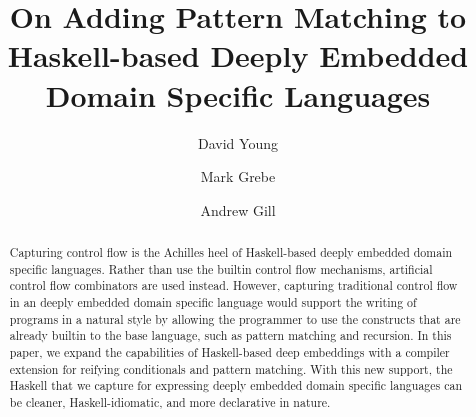 \documentclass[runningheads, a4paper]{llncs}
\begin{document}
\title{On Adding Pattern Matching to Haskell-based
  Deeply Embedded Domain Specific Languages}


\author{David Young \and Mark Grebe \and Andrew Gill}

\maketitle





\linenumbers
\begin{abstract}
  Capturing control flow is the Achilles heel of Haskell-based
  deeply embedded domain specific languages.
  Rather than use
  the builtin control flow mechanisms, artificial control flow combinators
  are used instead.
  However, capturing traditional control flow in an deeply embedded domain specific language
  would support the writing of programs in a natural style by allowing the programmer to use the
  constructs that are already builtin to the base language, such as pattern
  matching and recursion.
  In this paper, we expand the capabilities of
  Haskell-based deep embeddings with a compiler extension
  for reifying conditionals and pattern matching.
  With this new support, the Haskell that we capture for expressing
  deeply embedded domain specific languages can be cleaner, Haskell-idiomatic,
  and more declarative in nature.

\end{abstract}
\end{document}
